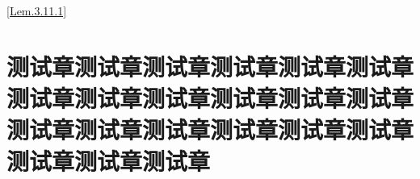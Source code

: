\documentclass[color=blue]{textbook-cn}%
\newlength{\la}\newlength{\lb}\newlength{\lc}\newlength{\ld}
\begin{document}







\lipsum[1]
\Example{\lipsum[1]}

\Answer{\lipsum[2]}


\begin{Definition}[定义名称]
\lipsum[1]
\end{Definition}

\begin{Lemma}[定义名称]
	\lipsum[2]
\end{Lemma}

\begin{Lemma}[定义名称]
	\lipsum[2]
\end{Lemma}

\ref{Lem.3.11.1}
\pageref{Lem.3.11.2}

\begin{Proposition}[定义名称]
	\lipsum[2]
\end{Proposition}


\begin{Corollary}[定义名称]
	\lipsum[2]
\end{Corollary}


\begin{Definition}[定义名称]
	\lipsum[2]
\end{Definition}


\chapter{测试章测试章测试章测试章测试章测试章测试章测试章测试章测试章测试章测试章测试章测试章测试章测试章测试章测试章测试章测试章测试章}
\lipsum
\end{document}
